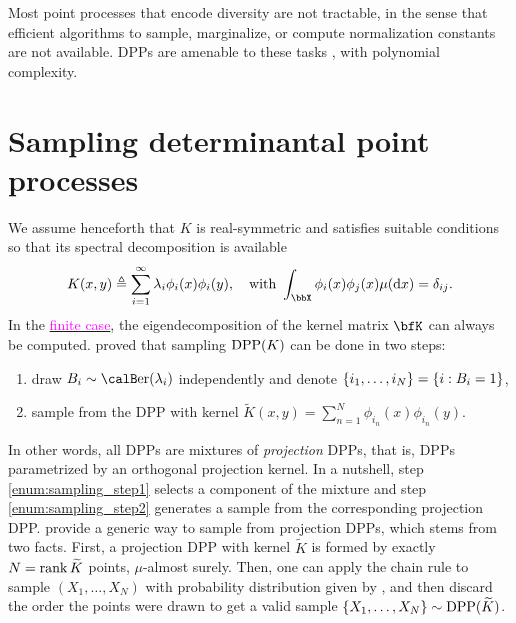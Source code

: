 \documentclass[twoside,11pt]{article}
\begin{document}
        Most point processes that encode diversity are not tractable, in the sense that efficient algorithms to sample, marginalize, or compute normalization constants are not available.
        DPPs are amenable to these tasks \citep{KuTa12,Gil14}, with polynomial complexity.


    \section{Sampling determinantal point processes} %
    \label{sec:sampling}

        We assume henceforth that $K$ is real-symmetric and satisfies suitable conditions \cite[Theorem 3]{Sos00} so that its spectral decomposition is available
        \begin{equation*}
        \label{eq:eigdec_kernel}
        K(x,y)
        \triangleq
          \suml_{i=1}^{\infty}
            \lambda_i \phi_i(x) \phi_i(y),
          \quad \text{with }
            \int_{\bbX} \phi_i(x) \phi_j(x) \mu(\diff x) = \delta_{ij}.
        \end{equation*}
        In the \href{https://dppy.readthedocs.io/en/latest/finite_dpps/exact_sampling.html}{\textcolor{magenta}{finite case}}, the eigendecomposition of the kernel matrix $\bfK$ can always be computed.
        \citet[Theorem 7]{HKPV06} proved that sampling $\operatorname{DPP}(K)$ can be done in two steps:
        \begin{enumerate}
            \item draw $B_i\sim\Ber(\lambda_i)$ independently and denote $\left\{ i_1,\dots,i_{N} \right\} = \left\{ i:B_i=1 \right\}$,\label{enum:sampling_step1}
            \item sample from the DPP with kernel $\tilde{K}(x,y) = \sum_{n=1}^{N}\phi_{i_n}(x) \phi_{i_n}(y)$.\label{enum:sampling_step2}
        \end{enumerate}
        In other words, all DPPs are mixtures of \emph{projection} DPPs, that is, DPPs parametrized by an orthogonal projection kernel.
        In a nutshell, step \ref{enum:sampling_step1} selects a component of the mixture and step \ref{enum:sampling_step2} generates a sample from the corresponding projection DPP.
        \citet[Algorithm 18]{HKPV06} provide a generic way to sample from projection DPPs, which stems from two facts.
        First,  a projection DPP with kernel $\tilde{K}$ is formed by exactly $N=\operatorname{rank} \widetilde{K}$ points, $\mu$-almost surely.
        Then, one can apply the chain rule to sample $(X_1,\dots,X_N)$ with probability distribution given by , and then discard the order the points were drawn to get a valid sample $\left\{ X_{1}, \dots, X_{N} \right\} \sim \operatorname{DPP}(\widetilde{K})$.
\end{document}
